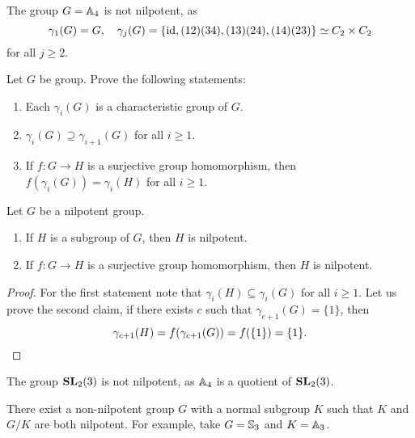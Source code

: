 \begin{example}
    The group $G=\mathbb{A}_4$ is not nilpotent, as 
	\[
		\gamma_1(G)=G,\quad
		\gamma_j(G)=\{\operatorname{id},(12)(34),(13)(24),(14)(23)\}\simeq C_2\times C_2
	\]
	for all $j\geq2$. 
\end{example}

\begin{exercise}
	\label{xca:gamma}
	Let $G$ be group. Prove the following statements:
	\begin{enumerate}
		\item Each $\gamma_i(G)$ is a characteristic group of $G$.
		\item $\gamma_i(G)\supseteq\gamma_{i+1}(G)$ for all $i\geq1$.
		\item If $f\colon G\to H$ is a surjective group homomorphism, then 
			$f(\gamma_i(G))=\gamma_i(H)$ for all $i\geq1$.
	\end{enumerate}
\end{exercise}


\begin{theorem}
	\label{theorem:nilpotent}
	Let $G$ be a nilpotent group. 
	\begin{enumerate}
		\item If $H$ is a subgroup of $G$, then $H$ is nilpotent. 
		\item If $f\colon G\to H$ is a surjective group homomorphism, then $H$ is nilpotent. 
	\end{enumerate}
\end{theorem}

\begin{proof}
	For the first statement note that $\gamma_i(H)\subseteq\gamma_i(G)$ for all 
	$i\geq1$. Let us prove the second claim, if there exists $c$ such that $\gamma_{c+1}(G)=\{1\}$, 
	then 
	\[
	\gamma_{c+1}(H)=f(\gamma_{c+1}(G))=f(\{1\})=\{1\}.\qedhere
	\]
\end{proof}

\begin{example}
    The group $\mathbf{SL}_2(3)$ is not nilpotent, as $\mathbb{A}_4$ 
	is a quotient of $\mathbf{SL}_2(3)$. 
\end{example}

There exist a non-nilpotent group $G$ with a normal subgroup $K$ 
such that $K$ and $G/K$ are both nilpotent. For example, take $G=\mathbb{S}_3$ and $K=\mathbb{A}_3$. 

